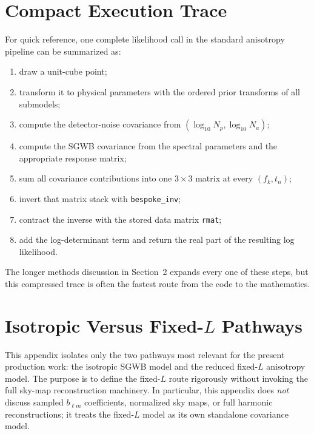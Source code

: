 \documentclass[11pt]{article}
\begin{document}
\section{Compact Execution Trace}
For quick reference, one complete likelihood call in the standard anisotropy pipeline can be summarized as:
\begin{enumerate}
\item draw a unit-cube point;
\item transform it to physical parameters with the ordered prior transforms of all submodels;
\item compute the detector-noise covariance from $(\log_{10}N_p,\log_{10}N_a)$;
\item compute the SGWB covariance from the spectral parameters and the appropriate response matrix;
\item sum all covariance contributions into one $3\times 3$ matrix at every $(f_k,t_n)$;
\item invert that matrix stack with \texttt{bespoke\_inv};
\item contract the inverse with the stored data matrix \texttt{rmat};
\item add the log-determinant term and return the real part of the resulting log likelihood.
\end{enumerate}
The longer methods discussion in Section~2 expands every one of these steps, but this compressed trace is often the fastest route from the code to the mathematics.

\section{Isotropic Versus Fixed-\texorpdfstring{$L$}{L} Pathways}
This appendix isolates only the two pathways most relevant for the present production work: the isotropic SGWB model and the reduced fixed-$L$ anisotropy model. The purpose is to define the fixed-$L$ route rigorously without invoking the full sky-map reconstruction machinery. In particular, this appendix does \emph{not} discuss sampled $b_{\ell m}$ coefficients, normalized sky maps, or full harmonic reconstructions; it treats the fixed-$L$ model as its own standalone covariance model.
\end{document}
